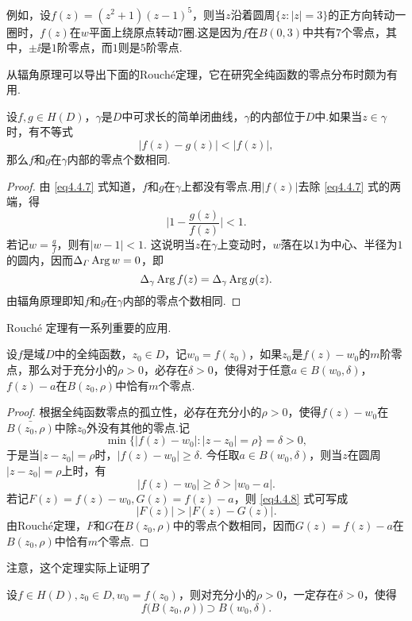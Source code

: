 例如，设$f(z)=(z^2+1)(z-1)^5$，则当$z$沿着圆周$\{z:|z|=3\}$的正方向转动一圈时，$f(z)$在$w$平面上绕原点转动$7$圈.这是因为$f$在$B(0,3)$中共有$7$个零点，其中，$\pm\ii$是$1$阶零点，而$1$则是$5$阶零点.

从辐角原理可以导出下面的Rouch\'e定理，它在研究全纯函数的零点分布时颇为有用.
\begin{theorem}\label{thm4.4.3}
  设$f,g\in H(D)$，$\gamma$是$D$中可求长的简单闭曲线，$\gamma$的内部位于$D$中.如果当$z\in\gamma$时，有不等式
  \begin{equation}\label{eq4.4.7}
    |f(z) - g(z)| < |f(z)|,
  \end{equation}
  那么$f$和$g$在$\gamma$内部的零点个数相同.
\end{theorem}
\begin{proof}
  由 \eqref{eq4.4.7} 式知道，$f$和$g$在$\gamma$上都没有零点.用$|f(z)|$去除 \eqref{eq4.4.7} 式的两端，得
  \[
    \bigg|1 - \frac{g(z)}{f(z)} \bigg| < 1.
  \]
  若记$w=\frac gf$，则有$|w-1|<1$. 这说明当$z$在$\gamma$上变动时，$w$落在以$1$为中心、半径为$1$的圆内，因而$\Delta_\varGamma\operatorname{Arg} w=0$，即
  \[
    \Delta_\gamma\operatorname{Arg} f(z) = \Delta_\gamma\operatorname{Arg} g(z).
  \]
  由辐角原理即知$f$和$g$在$\gamma$内部的零点个数相同.
\end{proof}

Rouch\'e 定理有一系列重要的应用.
\begin{theorem}\label{thm4.4.4}
  设$f$是域$D$中的全纯函数，$z_0\in D$，记$w_0=f(z_0)$，如果$z_0$是$f(z)-w_0$的$m$阶零点，那么对于充分小的$\rho>0$，必存在$\delta>0$，使得对于任意$a\in B(w_0,\delta)$，$f(z)-a$在$B(z_0,\rho)$中恰有$m$个零点.
\end{theorem}
\begin{proof}
  根据全纯函数零点的孤立性，必存在充分小的$\rho>0$，使得$f(z)-w_0$在$\bar{B(z_0,\rho)}$中除$z_0$外没有其他的零点.记
  \[
    \min\{|f(z)-w_0|:|z-z_0| = \rho\} = \delta>0,
  \]
  于是当$|z-z_0|=\rho$时，$|f(z)-w_0|\ge\delta$. 今任取$a\in B(w_0,\delta)$，则当$z$在圆周$|z-z_0|=\rho$上时，有
  \begin{equation}\label{eq4.4.8}
    |f(z) - w_0| \ge \delta > |w_0 - a|.
  \end{equation}
  若记$F(z)=f(z)-w_0,G(z)=f(z)-a$，则 \eqref{eq4.4.8} 式可写成
  \[
    |F(z)| > |F(z) - G(z)|.
  \]
  由Rouch\'e定理，$F$和$G$在$B(z_0,\rho)$中的零点个数相同，因而$G(z)=f(z)-a$在$B(z_0,\rho)$中恰有$m$个零点.
\end{proof}

注意，这个定理实际上证明了
\begin{corollary}\label{cor4.4.5}
  设$f\in H(D),z_0\in D,w_0=f(z_0)$，则对充分小的$\rho>0$，一定存在$\delta>0$，使得
  \[
    f\big(B(z_0,\rho)\big) \supset B(w_0,\delta).
  \]
\end{corollary}

